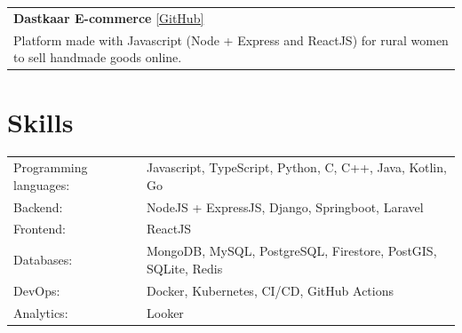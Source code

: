 \documentclass[a4paper,9pt]{extarticle}
\begin{document}
\begin{tabularx}{\linewidth}{ @{}X@{} }
\textbf{Dastkaar E-commerce} \hfill \href{https://github.com/saad1551/web-engineering-project-backend}{[GitHub]} \\
Platform made with Javascript (Node + Express and ReactJS) for rural women to sell handmade goods online. \\[0pt]













\end{tabularx}



\section{Skills}
\begin{tabularx}{\linewidth}{@{}l X@{}}
Programming languages: &  \normalsize{Javascript, TypeScript, Python, C, C++, Java, Kotlin, Go} \\
Backend: &  \normalsize{NodeJS + ExpressJS, Django, Springboot, Laravel} \\
Frontend:  &  \normalsize{ReactJS} \\
Databases:  &  \normalsize{MongoDB, MySQL, PostgreSQL, Firestore, PostGIS, SQLite, Redis} \\
DevOps:  &  \normalsize{Docker, Kubernetes, CI/CD, GitHub Actions} \\
Analytics:  &  \normalsize{Looker} \\
\end{tabularx}




\end{document}

